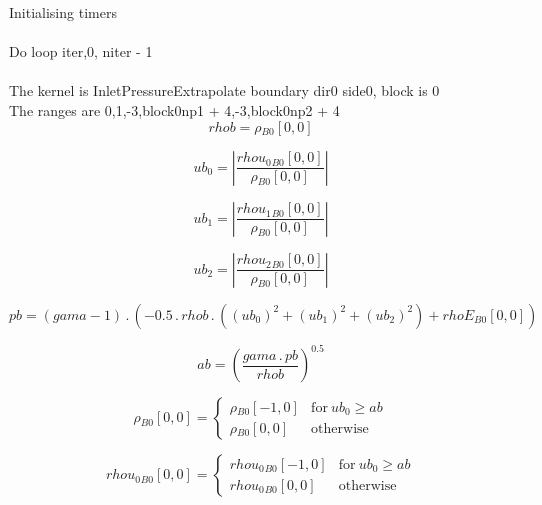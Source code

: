 \documentclass{article}
\begin{document}
\noindent Initialising timers\\
\\\noindent Do loop iter,0, niter - 1\\
\\\noindent The kernel is InletPressureExtrapolate boundary dir0 side0, block is 0\\\noindent The ranges are 0,1,-3,block0np1 + 4,-3,block0np2 + 4\\\begin{dmath}rhob = {\rho{_{B0}}}[{0,0}]\end{dmath}

\begin{dmath}ub_{0} = \left|{\frac{{rhou_{0}{_{B0}}}[{0,0}]}{{\rho{_{B0}}}[{0,0}]}}\right|\end{dmath}

\begin{dmath}ub_{1} = \left|{\frac{{rhou_{1}{_{B0}}}[{0,0}]}{{\rho{_{B0}}}[{0,0}]}}\right|\end{dmath}

\begin{dmath}ub_{2} = \left|{\frac{{rhou_{2}{_{B0}}}[{0,0}]}{{\rho{_{B0}}}[{0,0}]}}\right|\end{dmath}

\begin{dmath}pb = \left(gama - 1\right) \,.\, \left(- 0.5 \,.\, rhob \,.\, \left(\left(ub_{0} \right)^{2} + \left(ub_{1} \right)^{2} + \left(ub_{2} \right)^{2}\right) + {rhoE{_{B0}}}[{0,0}]\right)\end{dmath}

\begin{dmath}ab = \left(\frac{gama \,.\, pb}{rhob} \right)^{0.5}\end{dmath}

\begin{dmath}{\rho{_{B0}}}[{0,0}] = \begin{cases} {\rho{_{B0}}}[{-1,0}] & \text{for}\: ub_{0} \geq ab \\{\rho{_{B0}}}[{0,0}] & \text{otherwise} \end{cases}\end{dmath}

\begin{dmath}{rhou_{0}{_{B0}}}[{0,0}] = \begin{cases} {rhou_{0}{_{B0}}}[{-1,0}] & \text{for}\: ub_{0} \geq ab \\{rhou_{0}{_{B0}}}[{0,0}] & \text{otherwise} \end{cases}\end{dmath}
\end{document}
